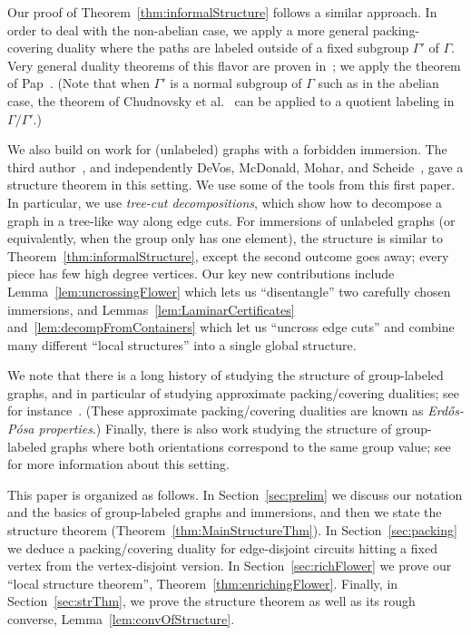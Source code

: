 \documentclass[11pt]{article}
\theoremstyle{definition}
\begin{document}
Our proof of Theorem~\ref{thm:informalStructure} follows a similar approach. In order to deal with the non-abelian case, we apply a more general packing-covering duality where the paths are labeled outside of a fixed subgroup $\Gamma'$ of $\Gamma$. Very general duality theorems of this flavor are proven in~\cite{GeelenRodriguezAPaths, PapAPaths, YamaguchiAPaths}; we apply the theorem of Pap~\cite{PapAPaths}. (Note that when $\Gamma'$ is a normal subgroup of $\Gamma$ such as in the abelian case, the theorem of Chudnovsky et al.~\cite{chudnovsky2006packing} can be applied to a quotient labeling in $\Gamma/\Gamma'$.) 

We also build on work for (unlabeled) graphs with a forbidden immersion. The third author~\cite{WOLLAN2015}, and independently DeVos, McDonald, Mohar, and Scheide~\cite{Devos2013note}, gave a structure theorem in this setting. We use some of the tools from this first paper. In particular, we use \emph{tree-cut decompositions}, which show how to decompose a graph in a tree-like way along edge cuts. For immersions of unlabeled graphs (or equivalently, when the group only has one element), the structure is similar to Theorem~\ref{thm:informalStructure}, except the second outcome goes away; every piece has few high degree vertices. Our key new contributions include Lemma~\ref{lem:uncrossingFlower} which lets us ``disentangle'' two carefully chosen immersions, and Lemmas~\ref{lem:LaminarCertificates} and~\ref{lem:decompFromContainers} which let us ``uncross edge cuts'' and combine many different ``local structures'' into a single global structure.

We note that there is a long history of studying the structure of group-labeled graphs, and in particular of studying approximate packing/covering dualities; see for instance~\cite{HJW2019, KK2016}. (These approximate packing/covering dualities are known as \emph{Erd\H{o}s-P\'{o}sa properties}.) Finally, there is also work studying the structure of group-labeled graphs where both orientations correspond to the same group value; see~\cite{LiuYoo25, ThomasYoo23, Wollan2010} for more information about this setting.

This paper is organized as follows. In Section~\ref{sec:prelim} we discuss our notation and the basics of group-labeled graphs and immersions, and then we state the structure theorem (Theorem~\ref{thm:MainStructureThm}). In Section~\ref{sec:packing} we deduce a packing/covering duality for edge-disjoint circuits hitting a fixed vertex from the vertex-disjoint version. In Section~\ref{sec:richFlower} we prove our ``local structure theorem'', Theorem~\ref{thm:enrichingFlower}. Finally, in Section~\ref{sec:strThm}, we prove the structure theorem as well as its rough converse, Lemma~\ref{lem:convOfStructure}.
\end{document}
